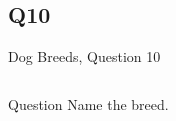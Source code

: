 \documentclass[11pt]{beamer}
\begin{document}
\subsection*{Q10}
\begin{frame}[t]{Dog Breeds, Question 10}
\begin{columns}[T,totalwidth=\linewidth]
\begin{column}{0.32\linewidth}
\begin{block}{Question}
Name the breed.
\end{block}
\end{column}
\begin{column}{0.65\linewidth}
\begin{center}
\texttt{[image: \{Images/newfoundland]}.jpeg}
\end{center}
\end{column}
\end{columns}
\end{frame}
\end{document}
